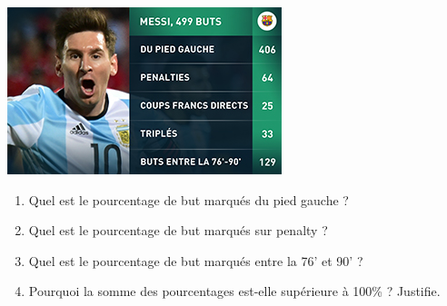 
\begin{center}
\includegraphics[scale=0.8]{Prop-35.jpg} 
\end{center}

\begin{enumerate}
\item Quel est le pourcentage de but marqués du pied gauche ?
\item Quel est le pourcentage de but marqués sur penalty ?
\item Quel est le pourcentage de but marqués entre la 76' et 90' ?
\item Pourquoi la somme des pourcentages est-elle supérieure à 100\% ? Justifie.
\end{enumerate}



